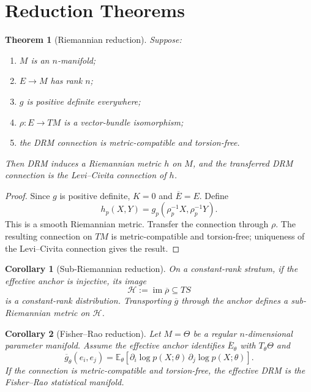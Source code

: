 \documentclass[11pt]{article}
\newtheorem{theorem}{Theorem}[section]
\newtheorem{corollary}{Corollary}[section]
\newcommand{\im}{\operatorname{im}}
\begin{document}
\section{Reduction Theorems}
\label{sec:reductions}

\begin{theorem}[Riemannian reduction]
Suppose:
\begin{enumerate}[label=(\roman*)]
\item $M$ is an $n$-manifold;
\item $E\to M$ has rank $n$;
\item $g$ is positive definite everywhere;
\item $\rho:E\to TM$ is a vector-bundle isomorphism;
\item the DRM connection is metric-compatible and torsion-free.
\end{enumerate}
Then DRM induces a Riemannian metric $h$ on $M$, and the transferred DRM
connection is the Levi--Civita connection of $h$.
\end{theorem}

\begin{proof}
Since $g$ is positive definite, $K=0$ and $\overline E=E$. Define
\[
h_p(X,Y)=g_p(\rho_p^{-1}X,\rho_p^{-1}Y).
\]
This is a smooth Riemannian metric. Transfer the connection through $\rho$.
The resulting connection on $TM$ is metric-compatible and torsion-free;
uniqueness of the Levi--Civita connection gives the result.
\end{proof}

\begin{corollary}[Sub-Riemannian reduction]
On a constant-rank stratum, if the effective anchor is injective, its image
\[
\mathcal H:=\im\overline\rho\subseteq TS
\]
is a constant-rank distribution. Transporting $\overline g$ through the
anchor defines a sub-Riemannian metric on $\mathcal H$.
\end{corollary}

\begin{corollary}[Fisher--Rao reduction]
Let $M=\Theta$ be a regular $n$-dimensional parameter manifold. Assume the
effective anchor identifies $\overline E_\theta$ with $T_\theta\Theta$ and
\[
\overline g_\theta(e_i,e_j)
=\mathbb E_\theta\!\left[
\partial_i\log p(X;\theta)\,
\partial_j\log p(X;\theta)
\right].
\]
If the connection is metric-compatible and torsion-free, the effective DRM is
the Fisher--Rao statistical manifold.
\end{corollary}
\end{document}
